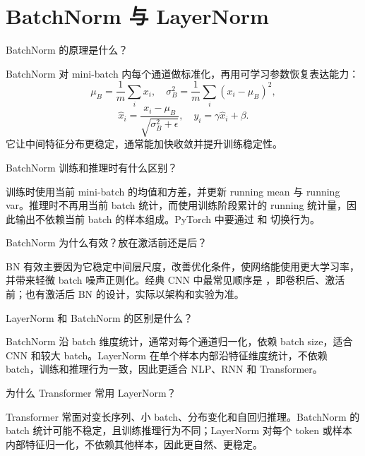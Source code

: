 \section{BatchNorm 与 LayerNorm}
\begin{interview}
BatchNorm 的原理是什么？
\end{interview}
\begin{answer}
BatchNorm 对 mini-batch 内每个通道做标准化，再用可学习参数恢复表达能力：
\[
\mu_B=\frac{1}{m}\sum_i x_i,
\quad
\sigma_B^2=\frac{1}{m}\sum_i(x_i-\mu_B)^2,
\]
\[
\hat{x}_i=\frac{x_i-\mu_B}{\sqrt{\sigma_B^2+\epsilon}},
\quad
 y_i=\gamma\hat{x}_i+\beta.
\]
它让中间特征分布更稳定，通常能加快收敛并提升训练稳定性。
\end{answer}
\begin{interview}
BatchNorm 训练和推理时有什么区别？
\end{interview}
\begin{answer}
训练时使用当前 mini-batch 的均值和方差，并更新 running mean 与 running var。推理时不再用当前 batch 统计，而使用训练阶段累计的 running 统计量，因此输出不依赖当前 batch 的样本组成。PyTorch 中要通过  和  切换行为。
\end{answer}
\begin{interview}
BatchNorm 为什么有效？放在激活前还是后？
\end{interview}
\begin{answer}
BN 有效主要因为它稳定中间层尺度，改善优化条件，使网络能使用更大学习率，并带来轻微 batch 噪声正则化。经典 CNN 中最常见顺序是 ，即卷积后、激活前；也有激活后 BN 的设计，实际以架构和实验为准。
\end{answer}
\begin{interview}
LayerNorm 和 BatchNorm 的区别是什么？
\end{interview}
\begin{answer}
BatchNorm 沿 batch 维度统计，通常对每个通道归一化，依赖 batch size，适合 CNN 和较大 batch。LayerNorm 在单个样本内部沿特征维度统计，不依赖 batch，训练和推理行为一致，因此更适合 NLP、RNN 和 Transformer。
\end{answer}
\begin{interview}
为什么 Transformer 常用 LayerNorm？
\end{interview}
\begin{answer}
Transformer 常面对变长序列、小 batch、分布变化和自回归推理。BatchNorm 的 batch 统计可能不稳定，且训练推理行为不同；LayerNorm 对每个 token 或样本内部特征归一化，不依赖其他样本，因此更自然、更稳定。
\end{answer}
